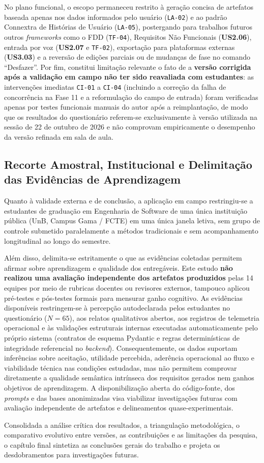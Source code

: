 No plano funcional, o escopo permaneceu restrito à geração concisa de artefatos baseada apenas nos dados informados pelo usuário (\texttt{LA-02}) e ao padrão Connextra de Histórias de Usuário (\texttt{LA-05}), postergando para trabalhos futuros outros \textit{frameworks} como o FDD (\texttt{TF-04}), Requisitos Não Funcionais (\textbf{US2.06}), entrada por voz (\textbf{US2.07} e \texttt{TF-02}), exportação para plataformas externas (\textbf{US3.03}) e a reversão de edições parciais ou de mudanças de fase no comando ``Desfazer''. Por fim, constitui limitação relevante o fato de a \textbf{versão corrigida após a validação em campo não ter sido reavaliada com estudantes}: as intervenções imediatas \texttt{CI-01} a \texttt{CI-04} (incluindo a correção da falha de concorrência na Fase 11 e a reformulação do campo de entrada) foram verificadas apenas por testes funcionais manuais do autor após a reimplantação, de modo que os resultados do questionário referem-se exclusivamente à versão utilizada na sessão de 22 de outubro de 2026 e não comprovam empiricamente o desempenho da versão refinada em sala de aula.

\subsection{Recorte Amostral, Institucional e Delimitação das Evidências de Aprendizagem}

Quanto à validade externa e de conclusão, a aplicação em campo restringiu-se a estudantes de graduação em Engenharia de Software de uma única instituição pública (UnB, Campus Gama / FCTE) em uma única janela letiva, sem grupo de controle submetido paralelamente a métodos tradicionais e sem acompanhamento longitudinal ao longo do semestre.

Além disso, delimita-se estritamente o que as evidências coletadas permitem afirmar sobre aprendizagem e qualidade dos entregáveis. Este estudo \textbf{não realizou uma avaliação independente dos artefatos produzidos} pelas 14 equipes por meio de rubricas docentes ou revisores externos, tampouco aplicou pré-testes e pós-testes formais para mensurar ganho cognitivo. As evidências disponíveis restringem-se à percepção autodeclarada pelos estudantes no questionário ($N = 65$), aos relatos qualitativos abertos, aos registros de telemetria operacional e às validações estruturais internas executadas automaticamente pelo próprio sistema (contratos de esquema Pydantic e regras determinísticas de integridade referencial no \textit{backend}). Consequentemente, os dados suportam inferências sobre aceitação, utilidade percebida, aderência operacional ao fluxo e viabilidade técnica nas condições estudadas, mas não permitem comprovar diretamente a qualidade semântica intrínseca dos requisitos gerados nem ganhos objetivos de aprendizagem. A disponibilização aberta do código-fonte, dos \textit{prompts} e das bases anonimizadas visa viabilizar investigações futuras com avaliação independente de artefatos e delineamentos quase-experimentais.

Consolidada a análise crítica dos resultados, a triangulação metodológica, o comparativo evolutivo entre versões, as contribuições e as limitações da pesquisa, o capítulo final sintetiza as conclusões gerais do trabalho e projeta os desdobramentos para investigações futuras.